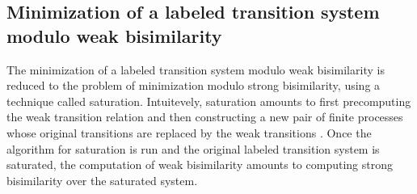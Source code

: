 \subsection{Minimization of a labeled transition system modulo weak bisimilarity}
The minimization of a labeled transition system modulo weak bisimilarity is reduced to the problem of minimization modulo strong bisimilarity, using a technique called saturation. Intuitevely, saturation amounts to first precomputing the weak transition relation and then constructing a new pair of finite processes whose original transitions are replaced by the weak transitions \cite{ReactiveSystems}. Once the algorithm for saturation is run and the original labeled transition system is saturated, the computation of weak bisimilarity amounts to computing strong bisimilarity over the saturated system.


